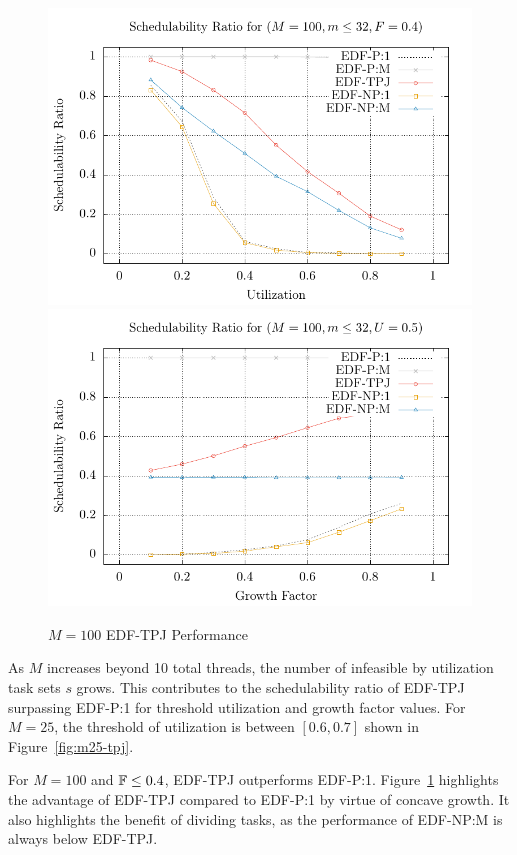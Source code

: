 \documentclass[a4paper,UKenglish,cleveref,autoref,english]{lipics-v2019}
\begin{document}
\begin{figure}[ht]
  \centering
  \includegraphics[width=\cwidth]{2D-M100m32F0_4xS}\quad
  \includegraphics[width=\cwidth]{2D-M100m32U0_5xS}%
  \caption{${M = 100}$ EDF-TPJ Performance}
  \label{fig:m100-tpj}
\end{figure}

As ${M}$ increases beyond 10 total threads, the number of infeasible
by utilization task sets ${s}$ grows. This contributes to the
schedulability ratio of EDF-TPJ surpassing EDF-P:1 for
threshold utilization and growth factor values. For ${M = 25}$, the
threshold of utilization is between ${[0.6,0.7]}$ shown in
Figure~\ref{fig:m25-tpj}.

For ${M = 100}$ and ${\mathbb{F} \le 0.4}$, EDF-TPJ outperforms
EDF-P:1. Figure~\ref{fig:m100-tpj} highlights the advantage of
EDF-TPJ compared to EDF-P:1 by virtue of concave growth. It also
highlights the benefit of dividing tasks, as the performance of
EDF-NP:M is always below EDF-TPJ.
\end{document}
